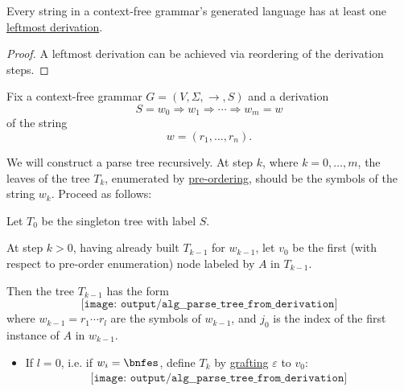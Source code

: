 \begin{proposition}\label{thm:leftmost_derivation_existence}
  Every string in a context-free grammar's generated language has at least one \hyperref[def:leftmost_derivation]{leftmost derivation}.
\end{proposition}
\begin{proof}
  A leftmost derivation can be achieved via reordering of the derivation steps.
\end{proof}

\begin{algorithm}\label{alg:derivation_to_parse_tree}
  Fix a context-free grammar \( G = (V, \Sigma, \to, S) \) and a derivation
  \begin{equation*}
    S = w_0 \Rightarrow w_1 \Rightarrow \cdots \Rightarrow w_m = w
  \end{equation*}
  of the string
  \begin{equation*}
    w = (r_1, \ldots, r_n).
  \end{equation*}

  We will construct a parse tree recursively. At step \( k \), where \( k = 0, \ldots, m \), the leaves of the tree \( T_k \), enumerated by \hyperref[def:ordered_tree_enumeration]{pre-ordering}, should be the symbols of the string \( w_k \). Proceed as follows:
  \begin{thmenum}
     Let \( T_0 \) be the singleton tree with label \( S \).

     At step \( k > 0 \), having already built \( T_{k-1} \) for \( w_{k-1} \), let \( v_0 \) be the first (with respect to pre-order enumeration) node labeled by \( A \) in \( T_{k-1} \).

    Then the tree \( T_{k-1} \) has the form
    \begin{equation*}
      \texttt{[image: output/alg\_\_parse\_tree\_from\_derivation]}
    \end{equation*}
    where \( w_{k-1} = r_1 \cdots r_l \) are the symbols of \( w_{k-1} \), and \( j_0 \) is the index of the first instance of \( A \) in \( w_{k-1} \).

    \begin{itemize}
      \item If \( l = 0 \), i.e. if \( w_i = \bnfes \), define \( T_k \) by \hyperref[def:ordered_tree_grafting]{grafting} \( \varepsilon \) to \( v_0 \):
      \begin{equation*}
        \begin{aligned}
          \texttt{[image: output/alg\_\_parse\_tree\_from\_derivation]}
        \end{aligned}
      \end{equation*}


\end{itemize}
\end{thmenum}
\end{algorithm}
